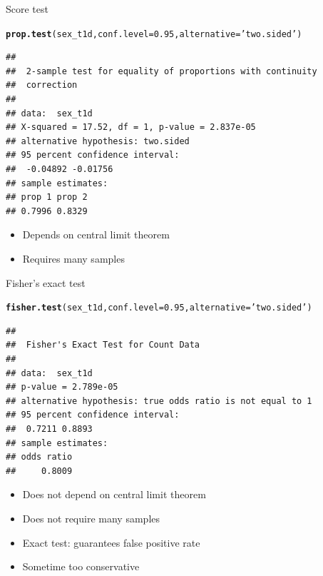 \documentclass{beamer}\usepackage[]{graphicx}\usepackage[]{color}
\makeatletter
\newcommand{\hlnum}[1]{\textcolor[rgb]{0.686,0.059,0.569}{#1}}%
\newcommand{\hlstr}[1]{\textcolor[rgb]{0.192,0.494,0.8}{#1}}%
\newcommand{\hlstd}[1]{\textcolor[rgb]{0.345,0.345,0.345}{#1}}%
\newcommand{\hlkwc}[1]{\textcolor[rgb]{0.333,0.667,0.333}{#1}}%
\newcommand{\hlkwd}[1]{\textcolor[rgb]{0.737,0.353,0.396}{\textbf{#1}}}%
\newenvironment{kframe}{%
 \def\at@end@of@kframe{}%
 \ifinner\ifhmode%
  \def\at@end@of@kframe{\end{minipage}}%
  \begin{minipage}{\columnwidth}%
 \fi\fi%
 \def\FrameCommand##1{\hskip\@totalleftmargin \hskip-\fboxsep
 \colorbox{shadecolor}{##1}\hskip-\fboxsep
     \hskip-\linewidth \hskip-\@totalleftmargin \hskip\columnwidth}%
 \MakeFramed {\advance\hsize-\width
   \@totalleftmargin\z@ \linewidth\hsize
   \@setminipage}}%
 {\par\unskip\endMakeFramed%
 \at@end@of@kframe}
\newenvironment{knitrout}{}{} %
\makeatother
\begin{document}
\begin{frame}[fragile]{Score test}
\begin{knitrout}\tiny
{}\color{fgcolor}\begin{kframe}
\begin{alltt}
\hlkwd{prop.test}\hlstd{(sex_t1d,} \hlkwc{conf.level}\hlstd{=}\hlnum{0.95}\hlstd{,} \hlkwc{alternative}\hlstd{=}\hlstr{'two.sided'}\hlstd{)}
\end{alltt}
\begin{verbatim}
## 
## 	2-sample test for equality of proportions with continuity
## 	correction
## 
## data:  sex_t1d
## X-squared = 17.52, df = 1, p-value = 2.837e-05
## alternative hypothesis: two.sided
## 95 percent confidence interval:
##  -0.04892 -0.01756
## sample estimates:
## prop 1 prop 2 
## 0.7996 0.8329
\end{verbatim}
\end{kframe}
\end{knitrout}
  \begin{itemize}
    \item Depends on central limit theorem
    \item Requires many samples
  \end{itemize}
\end{frame}

\begin{frame}[fragile]{Fisher's exact test}
\begin{knitrout}\tiny
{}\color{fgcolor}\begin{kframe}
\begin{alltt}
\hlkwd{fisher.test}\hlstd{(sex_t1d,} \hlkwc{conf.level}\hlstd{=}\hlnum{0.95}\hlstd{,} \hlkwc{alternative}\hlstd{=}\hlstr{'two.sided'}\hlstd{)}
\end{alltt}
\begin{verbatim}
## 
## 	Fisher's Exact Test for Count Data
## 
## data:  sex_t1d
## p-value = 2.789e-05
## alternative hypothesis: true odds ratio is not equal to 1
## 95 percent confidence interval:
##  0.7211 0.8893
## sample estimates:
## odds ratio 
##     0.8009
\end{verbatim}
\end{kframe}
\end{knitrout}
  \begin{itemize}
    \item Does not depend on central limit theorem
    \item Does not require many samples
    \item Exact test: guarantees false positive rate
    \item Sometime too conservative
  \end{itemize}
\end{frame}
\end{document}
